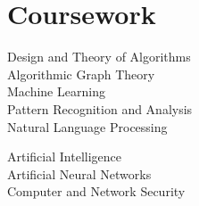 \documentclass[]{deedy-resume-openfont-rileyannis}
\begin{document}
\begin{minipage}[t]{0.33\textwidth}

\section{Coursework}
Design and Theory of Algorithms\\
Algorithmic Graph Theory\\
Machine Learning\\
Pattern Recognition and Analysis\\
Natural Language Processing\\
\sectionsep


Artificial Intelligence\\
Artificial Neural Networks\\
Computer and Network Security\\
\sectionsep



\end{minipage}
\end{document}
